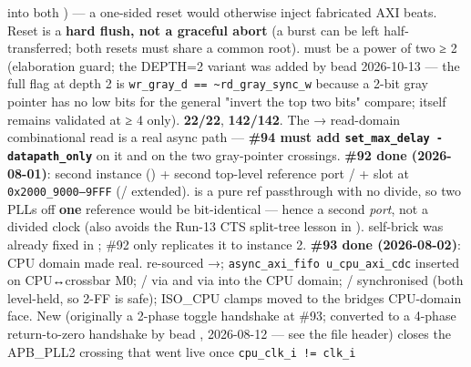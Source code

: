\begin{record}
\begin{enumerate}
  into both ) --- a one-sided reset would otherwise
  inject fabricated AXI beats. Reset is a \textbf{hard flush, not a
  graceful abort} (a burst can be left half-transferred; both resets
  must share a common root).  must be a power of two ≥ 2
  (elaboration guard; the DEPTH=2 variant was added by bead 
  2026-10-13 --- the full flag at depth 2 is
  \texttt{wr\_\allowbreak{}gray\_\allowbreak{}d\ =\allowbreak{}=\allowbreak{}\ \textasciitilde{}rd\_\allowbreak{}gray\_\allowbreak{}sync\_\allowbreak{}w}
  because a 2-bit gray pointer has no low bits for the general "invert
  the top two bits" compare;  itself remains
  validated at ≥ 4 only).  \textbf{22/22},
   \textbf{142/142}. \warn{} The  →
  read-domain combinational read is a real async path --- \textbf{\#94
  must add
  \texttt{set\_\allowbreak{}max\_\allowbreak{}delay\ -\allowbreak{}datapath\_\allowbreak{}only}}
  on it and on the two gray-pointer crossings. \textbf{\#92 done
  (2026-08-01)}: second  instance
  () + second top-level reference port
  / +  slot at
  \texttt{0x2000\_\allowbreak{}9000–9FFF}
  (/ extended).
   is a pure ref passthrough with no divide, so
  two PLLs off \textbf{one} reference would be bit-identical --- hence a
  second \emph{port}, not a divided clock (also avoids the Run-13 CTS
  split-tree lesson in ).  
  self-brick was already fixed in ; \#92 only replicates
  it to instance 2. \textbf{\#93 done (2026-08-02)}: CPU domain made
  real.  re-sourced →;
  \texttt{async\_\allowbreak{}axi\_\allowbreak{}fifo\ u\_\allowbreak{}cpu\_\allowbreak{}axi\_\allowbreak{}cdc}
  inserted on CPU↔crossbar M0; / via
   and  via 
  into the CPU domain; / synchronised
  (both level-held, so 2-FF is safe); ISO\_CPU clamps moved to the
  bridge\textquotesingle s CPU-domain face. New
  \textbf{} (originally a 2-phase toggle
  handshake at \#93; converted to a 4-phase return-to-zero handshake by
  bead , 2026-08-12 --- see the file header) closes the
  APB\_PLL2 crossing that went live once
  \texttt{cpu\_\allowbreak{}clk\_\allowbreak{}i\ !=\allowbreak{}\ clk\_\allowbreak{}i}

\end{enumerate}
\end{record}
